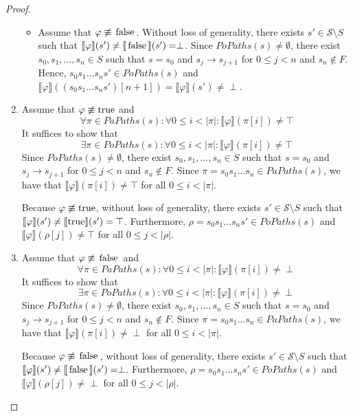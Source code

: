 \documentclass[12pt]{article}
\newcommand{\TRUE}{\mbox{\lstinline{true}}}
\newcommand{\FALSE}{\mbox{\lstinline{false}}}
\theoremstyle{definition}
\newcommand{\satisfaction}[1]{\llbracket #1 \rrbracket}
\newenvironment{franck}{\color{red}}{\color{black}}
\begin{document}
\begin{franck}
\begin{proof}
\begin{enumerate}
\begin{itemize}
\item
Assume that $\varphi \not\equiv \FALSE$.  Without loss of generality, there exists $s' \in \mathcal{S} \setminus S$ such that $\satisfaction{\varphi}(s') \not= \satisfaction{\FALSE}(s') = \perp$.  Since $\mathit{PoPaths}(s) \not= \emptyset$, there exist $s_0, s_1, \ldots, s_n \in S$ such that $s = s_0$ and $s_j \rightarrow s_{j+1}$ for $0 \leq j < n$ and $s_n \not\in F$.  Hence, $s_0 s_1 \ldots s_n s' \in \mathit{PoPaths}(s)$ and $\satisfaction{\varphi}((s_0 s_1 \ldots s_n s')[n+1]) = \satisfaction{\varphi}(s') \not= \perp$.
\end{itemize}
\item
Assume that $\varphi \not\equiv \TRUE$ and
\[
\forall \pi \in \mathit{PaPaths}(s) : \forall 0 \leq i < |\pi| : \satisfaction{\varphi}(\pi[i]) \not= \top  
\]
It suffices to show that
\[
\exists \pi \in \mathit{PoPaths}(s) : \forall 0 \leq i < |\pi| : \satisfaction{\varphi}(\pi[i]) \not= \top
\]
Since $\mathit{PoPaths}(s) \not= \emptyset$, there exist $s_0, s_1, \ldots, s_n \in S$ such that $s = s_0$ and $s_j \rightarrow s_{j+1}$ for $0 \leq j < n$ and $s_n \not\in F$.  Since $\pi = s_0 s_1 \ldots s_n \in \mathit{PaPaths}(s)$, we have that $\satisfaction{\varphi}(\pi[i]) \not= \top$ for all $0 \leq i < |\pi|$.

Because $\varphi \not\equiv \TRUE$, without loss of generality, there exists $s' \in \mathcal{S} \setminus S$ such that $\satisfaction{\varphi}(s') \not= \satisfaction{\TRUE}(s') = \top$.  Furthermore, $\rho = s_0 s_1 \ldots s_n s' \in \mathit{PoPaths}(s)$ and $\satisfaction{\varphi}(\rho[j]) \not= \top$ for all $0 \leq j < |\rho|$.
\item
Assume that $\varphi \not\equiv \FALSE$ and
\[
\forall \pi \in \mathit{PaPaths}(s) : \forall 0 \leq i < |\pi| : \satisfaction{\varphi}(\pi[i]) \not= \perp  
\]
It suffices to show that
\[
\exists \pi \in \mathit{PoPaths}(s) : \forall 0 \leq i < |\pi| : \satisfaction{\varphi}(\pi[i]) \not= \perp
\]
Since $\mathit{PoPaths}(s) \not= \emptyset$, there exist $s_0, s_1, \ldots, s_n \in S$ such that $s = s_0$ and $s_j \rightarrow s_{j+1}$ for $0 \leq j < n$ and $s_n \not\in F$.  Since $\pi = s_0 s_1 \ldots s_n \in \mathit{PaPaths}(s)$, we have that $\satisfaction{\varphi}(\pi[i]) \not= \perp$ for all $0 \leq i < |\pi|$.

Because $\varphi \not\equiv \FALSE$, without loss of generality, there exists $s' \in \mathcal{S} \setminus S$ such that $\satisfaction{\varphi}(s') \not= \satisfaction{\FALSE}(s') = \perp$.  Furthermore, $\rho = s_0 s_1 \ldots s_n s' \in \mathit{PoPaths}(s)$ and $\satisfaction{\varphi}(\rho[j]) \not= \perp$ for all $0 \leq j < |\rho|$.
\end{enumerate}
\end{proof}
\end{franck}
\end{document}
